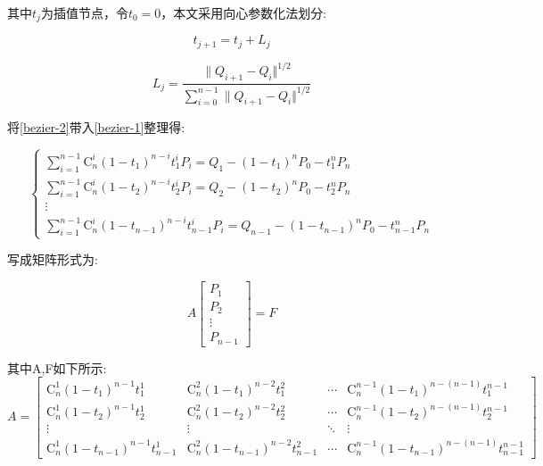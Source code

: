 其中$t_j$为插值节点，令$t_0=0$，本文采用向心参数化法划分\cite{lee1989choosing}:

\begin{equation}
    t_{j+1}=t_j+L_j
\end{equation}

\begin{equation}
    L_j=\frac{\|Q_{i+1}-Q_i\Vert^{1/2}}{\sum_{i=0}^{n-1}\|Q_{i+1}-Q_i\Vert^{1/2}}
\end{equation}

将\cref{bezier-2}带入\cref{bezier-1}整理得:

\begin{equation}
    \left\{
        \begin{array}{lcl}
            \sum_{i=1}^{n-1}\mathrm{C}^i_n(1-t_1)^{n-i}t_1^iP_i=Q_1-(1-t_1)^n P_0-t_1^nP_n\\
            \sum_{i=1}^{n-1}\mathrm{C}^i_n(1-t_2)^{n-i}t_2^iP_i=Q_2-(1-t_2)^n P_0-t_2^nP_n\\
            \vdots \\
            \sum_{i=1}^{n-1}\mathrm{C}^i_n(1-t_{n-1})^{n-i}t_{n-1}^iP_i=Q_{n-1}-(1-t_{n-1})^nP_0-t_{n-1}^nP_n
        \end{array}      
    \right.
\end{equation}

写成矩阵形式为:

\begin{equation}
    A
    \left[
        \begin{array}{c}
            P_1\\
            P_2\\
            \vdots\\
            P_{n-1}
        \end{array}
    \right]
    =
    F
\end{equation}

其中A,F如下所示:
\begin{equation*}
    A=\left[
        \begin{array}{cccc}
            \mathrm{C}^1_n(1-t_1)^{n-1}t_1^1&\mathrm{C}^2_n(1-t_1)^{n-2}t_1^2&\cdots &\mathrm{C}^{n-1}_n(1-t_1)^{n-(n-1)}t_1^{n-1}\\
            \mathrm{C}^1_n(1-t_2)^{n-1}t_2^1&\mathrm{C}^2_n(1-t_2)^{n-2}t_2^2&\cdots &\mathrm{C}^{n-1}_n(1-t_2)^{n-(n-1)}t_2^{n-1}\\
            \vdots&\vdots&\ddots&\vdots\\
            \mathrm{C}^1_n(1-t_{n-1})^{n-1}t_{n-1}^1&\mathrm{C}^2_n(1-t_{n-1})^{n-2}t_{n-1}^2&\cdots &\mathrm{C}^{n-1}_n(1-t_{n-1})^{n-(n-1)}t_{n-1}^{n-1}
        \end{array}
    \right]
\end{equation*}

